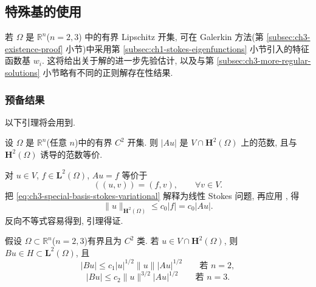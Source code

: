 \hypertarget{chapter-03-subsection-3-7-start}{}
\subsection{特殊基的使用}
\label{subsec:ch3-special-basis}
若 $\Omega$ 是 $\mathbb R^n$($n=2,3$) 中的有界 Lipschitz 开集, 可在 Galerkin 方法(第 \ref{subsec:ch3-existence-proof} 小节)中采用第 \ref{subsec:ch1-stokes-eigenfunctions} 小节引入的特征函数基 $w_i$. 这将给出关于解的进一步先验估计, 以及与第 \ref{subsec:ch3-more-regular-solutions} 小节略有不同的正则解存在性结果.

\hypertarget{chapter-03-page-227}{}
\subsubsection{预备结果}
\label{subsubsec:ch3-special-basis-preliminary}
以下引理将会用到.

\begin{Lemma}
\label{lem:ch3-special-basis-a-norm}
设 $\Omega$ 是 $\mathbb R^n$(任意 $n$)中的有界 $C^2$ 开集. 则 $|Au|$ 是 $V\cap\mathbf H^2(\Omega)$ 上的范数, 且与 $\mathbf H^2(\Omega)$ 诱导的范数等价.
\end{Lemma}

\begin{Proof}
对 $u\in V$, $f\in\mathbf L^2(\Omega)$, $Au=f$ 等价于
\begin{equation}
((u,v))=(f,v),
\qquad\forall v\in V.
\label{eq:ch3-special-basis-stokes-variational}
\end{equation}
把 \eqref{eq:ch3-special-basis-stokes-variational} 解释为线性 Stokes 问题, 再应用 , 得
\[
\lVert u\rVert_{\mathbf H^2(\Omega)}\leq c_0|f|=c_0|Au|.
\]
反向不等式容易得到, 引理得证.
\end{Proof}

\begin{Lemma}
\label{lem:ch3-special-basis-bu-estimates}
假设 $\Omega\subset\mathbb R^n$($n=2,3$)有界且为 $C^2$ 类. 若 $u\in V\cap\mathbf H^2(\Omega)$, 则 $Bu\in H\subset\mathbf L^2(\Omega)$, 且
\begin{equation}
|Bu|\leq c_1|u|^{1/2}\lVert u\rVert|Au|^{1/2}
\qquad\text{若 }n=2,
\label{eq:ch3-special-basis-bu-2d}
\end{equation}
\begin{equation}
|Bu|\leq c_2\lVert u\rVert^{3/2}|Au|^{1/2}
\qquad\text{若 }n=3.
\label{eq:ch3-special-basis-bu-3d}
\end{equation}
\end{Lemma}


